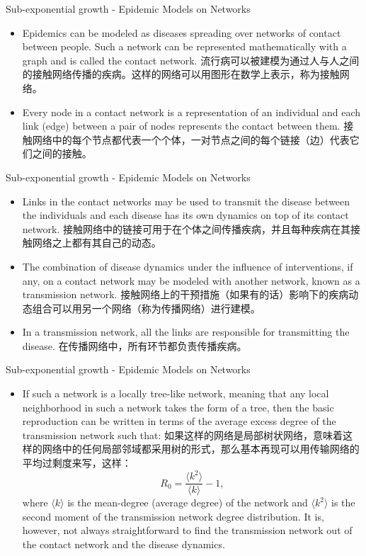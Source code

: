 \documentclass[
  notheorems,
  aspectratio=54,
]{beamer}
\begin{document}
\begin{frame}{Sub-exponential growth - Epidemic Models on Networks}
  \begin{itemize}
    \item Epidemics can be modeled as diseases spreading over networks of contact between people. Such a network can be represented mathematically with a graph and is called the contact network. 流行病可以被建模为通过人与人之间的接触网络传播的疾病。这样的网络可以用图形在数学上表示，称为接触网络。
    \item Every node in a contact network is a representation of an individual and each link (edge) between a pair of nodes represents the contact between them. 接触网络中的每个节点都代表一个个体，一对节点之间的每个链接（边）代表它们之间的接触。
  \end{itemize}
\end{frame}

\begin{frame}{Sub-exponential growth - Epidemic Models on Networks}
  \begin{itemize}
    \item Links in the contact networks may be used to transmit the disease between the individuals and each disease has its own dynamics on top of its contact network. 接触网络中的链接可用于在个体之间传播疾病，并且每种疾病在其接触网络之上都有其自己的动态。
    \item The combination of disease dynamics under the influence of interventions, if any, on a contact network may be modeled with another network, known as a transmission network. 接触网络上的干预措施（如果有的话）影响下的疾病动态组合可以用另一个网络（称为传播网络）进行建模。
    \item  In a transmission network, all the links are responsible for transmitting the disease. 在传播网络中，所有环节都负责传播疾病。
  \end{itemize}
\end{frame}

\begin{frame}{Sub-exponential growth - Epidemic Models on Networks}
  \begin{itemize}
    \item If such a network is a locally tree-like network, meaning that any local neighborhood in such a network takes the form of a tree, then the basic reproduction can be written in terms of the average excess degree of the transmission network such that: 如果这样的网络是局部树状网络，意味着这样的网络中的任何局部邻域都采用树的形式，那么基本再现可以用传输网络的平均过剩度来写，这样：
      $$ {\displaystyle R_{0}={\frac {\langle k^{2}\rangle }{\langle k\rangle }}-1}, $$
    where 
${\displaystyle {\langle k\rangle }}$ is the mean-degree (average degree) of the network and 
${\displaystyle {\langle k^{2}\rangle }}$ is the second moment of the transmission network degree distribution.
It is, however, not always straightforward to find the transmission network out of the contact network and the disease dynamics.
  \end{itemize}
\end{frame}
\end{document}
